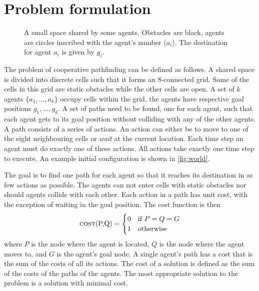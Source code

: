 \section{Problem formulation}\label{sec:problem}

\begin{figure}[t]
    \centering
    \def\svgscale{.7}
    
    \caption{A small space shared by some agents. Obstacles are black, agents
        are circles inscribed with the agent's number ($a_i$). The destination
        for agent $a_i$ is given by $g_i$.}
    \label{fig:world}
\end{figure}


The problem of cooperative pathfinding can be defined as follows. A shared
space is divided into discrete cells such that it forms an 8-connected grid.
Some of the cells in this grid are static obstacles while the other cells are
open. A set of $k$ agents $\{a_1, \ldots, a_k\}$ occupy cells within the grid,
the agents have respective goal positions $g_1, \ldots, g_k$. A set of paths
need to be found, one for each agent, such that each agent gets to its goal
position without colliding with any of the other agents. A path consists of a
series of actions. An action can either be to move to one of the eight
neighbouring cells or \emph{wait} at the current location. Each time step an
agent must do exactly one of these actions. All actions take exactly one time 
step to execute. An example initial configuration is
shown in \autoref{fig:world}.

The goal is to find one path for each agent so that it reaches its destination 
in as few actions as possible. The agents can not enter cells with static 
obstacles nor should agents collide with each other. Each action in a path has 
unit cost, with the exception of waiting in the goal position. The cost 
function is then
\[
\text{\textsc{cost}(P,Q)} =
\begin{cases}
    0 & \text{if } P = Q = G \\
    1 & \text{otherwise}
\end{cases}
\]
where $P$ is the node where the agent is located, $Q$ is the node where the
agent moves to, and $G$ is the agent's goal node. A single agent's path has a
cost that is the sum of the costs of all its actions. The cost of a solution is
defined as the sum of the costs of the paths of the agents. The most
appropriate solution to the problem is a solution with minimal cost.

